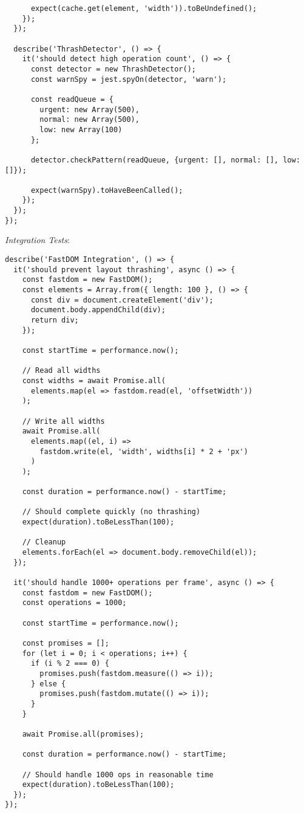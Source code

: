 \documentclass[11pt]{article}
\begin{document}
\begin{verbatim}
      expect(cache.get(element, 'width')).toBeUndefined();
    });
  });
  
  describe('ThrashDetector', () => {
    it('should detect high operation count', () => {
      const detector = new ThrashDetector();
      const warnSpy = jest.spyOn(detector, 'warn');
      
      const readQueue = {
        urgent: new Array(500),
        normal: new Array(500),
        low: new Array(100)
      };
      
      detector.checkPattern(readQueue, {urgent: [], normal: [], low: []});
      
      expect(warnSpy).toHaveBeenCalled();
    });
  });
});
\end{verbatim}

\emph{Integration Tests}:

\begin{verbatim}
describe('FastDOM Integration', () => {
  it('should prevent layout thrashing', async () => {
    const fastdom = new FastDOM();
    const elements = Array.from({ length: 100 }, () => {
      const div = document.createElement('div');
      document.body.appendChild(div);
      return div;
    });
    
    const startTime = performance.now();
    
    // Read all widths
    const widths = await Promise.all(
      elements.map(el => fastdom.read(el, 'offsetWidth'))
    );
    
    // Write all widths
    await Promise.all(
      elements.map((el, i) => 
        fastdom.write(el, 'width', widths[i] * 2 + 'px')
      )
    );
    
    const duration = performance.now() - startTime;
    
    // Should complete quickly (no thrashing)
    expect(duration).toBeLessThan(100);
    
    // Cleanup
    elements.forEach(el => document.body.removeChild(el));
  });
  
  it('should handle 1000+ operations per frame', async () => {
    const fastdom = new FastDOM();
    const operations = 1000;
    
    const startTime = performance.now();
    
    const promises = [];
    for (let i = 0; i < operations; i++) {
      if (i % 2 === 0) {
        promises.push(fastdom.measure(() => i));
      } else {
        promises.push(fastdom.mutate(() => i));
      }
    }
    
    await Promise.all(promises);
    
    const duration = performance.now() - startTime;
    
    // Should handle 1000 ops in reasonable time
    expect(duration).toBeLessThan(100);
  });
});
\end{verbatim}
\end{document}
